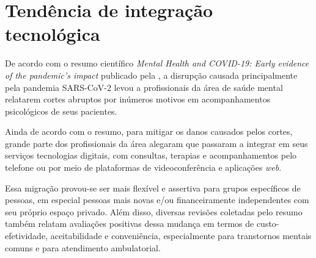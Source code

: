 \section{Tendência de integração tecnológica}
\label{sec:tendenciaDeIntegracaoTecnologica}

De acordo com o resumo científico \textit{Mental Health and COVID-19: Early evidence of the pandemic’s impact} publicado pela , a disrupção causada principalmente pela pandemia SARS-CoV-2 levou a profissionais da área de saúde mental relatarem cortes abruptos por inúmeros motivos em acompanhamentos psicológicos de seus pacientes.

Ainda de acordo com o resumo, para mitigar os danos causados pelos cortes, grande parte dos profissionais da área alegaram que passaram a integrar em seus serviços tecnologias digitais, com consultas, terapias e acompanhamentos pelo telefone ou por meio de plataformas de videoconferência e aplicações \textit{web}.

Essa migração provou-se ser mais flexível e assertiva para grupos específicos de pessoas, em especial pessoas mais novas e/ou financeiramente independentes com seu próprio espaço privado. Além disso, diversas revisões coletadas pelo resumo também relatam avaliações positivas dessa mudança em termos de custo-efetividade, aceitabilidade e conveniência, especialmente para transtornos mentais comuns e para atendimento ambulatorial.
